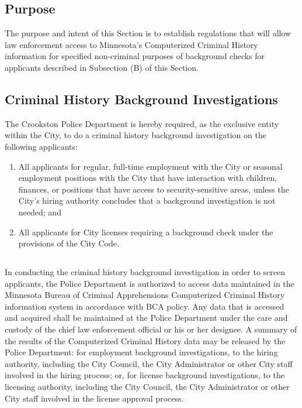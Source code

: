\subsection{Purpose}
The purpose and intent of this Section is to establish regulations that will allow law enforcement access to Minnesota’s Computerized Criminal History information for specified non-criminal purposes of background checks for applicants described in Subsection (B) of this Section.
\subsection{Criminal History Background Investigations}
The Crookston Police Department is hereby required, as the exclusive entity within the City, to do a criminal history background investigation on the following applicants:
\begin{enumerate}[{\indent}1)]
    \item All applicants for regular, full-time employment with the City or seasonal employment positions with the City that have interaction with children, finances, or positions that have access to security-sensitive areas, unless the City’s hiring authority concludes that a background investigation is not needed; and
    \item All applicants for City licenses requiring a background check under the provisions of the City Code.
\end{enumerate}
\subsection{}
In conducting the criminal history background investigation in order to screen applicants, the Police Department is authorized to access data maintained in the Minnesota Bureau of Criminal Apprehensions Computerized Criminal History information system in accordance with BCA policy. Any data that is accessed and acquired shall be maintained at the Police Department under the care and custody of the chief law enforcement official or his or her designee. A summary of the results of the Computerized Criminal History data may be released by the Police Department: for employment background investigations, to the hiring authority, including the City Council, the City Administrator or other City staff involved in the hiring process; or, for license background investigations, to the licensing authority, including the City Council, the City Administrator or other City staff involved in the license approval process.
